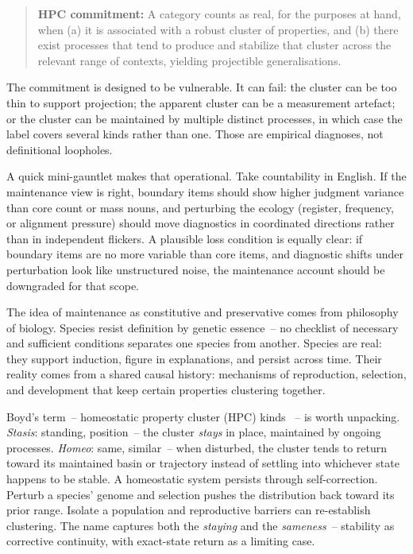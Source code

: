 \begin{quote}
\textbf{HPC commitment:} A category counts as real, for the purposes at hand, when (a) it is associated with a robust cluster of properties, and (b) there exist processes that tend to produce and stabilize that cluster across the relevant range of contexts, yielding projectible generalisations.
\end{quote}

The commitment is designed to be vulnerable. It can fail: the cluster can be too thin to support projection; the apparent cluster can be a measurement artefact; or the cluster can be maintained by multiple distinct processes, in which case the label covers several kinds rather than one. Those are empirical diagnoses, not definitional loopholes.

A quick mini-gauntlet makes that operational. Take countability in English. If the maintenance view is right, boundary items should show higher judgment variance than core count or mass nouns, and perturbing the ecology (register, frequency, or alignment pressure) should move diagnostics in coordinated directions rather than in independent flickers. A plausible loss condition is equally clear: if boundary items are no more variable than core items, and diagnostic shifts under perturbation look like unstructured noise, the maintenance account should be downgraded for that scope.

The idea of maintenance as constitutive and preservative comes from philosophy of biology. Species resist definition by genetic essence~-- no checklist of necessary and sufficient conditions separates one species from another. Species are real: they support induction, figure in explanations, and persist across time. Their reality comes from a shared causal history: mechanisms of reproduction, selection, and development that keep certain properties clustering together.

Boyd's term~-- homeostatic property cluster (HPC) kinds \citep{boyd1991,boyd1999}~-- is worth unpacking. \emph{Stasis}: standing, position~-- the cluster \emph{stays} in place, maintained by ongoing processes. \emph{Homeo}: same, similar~-- when disturbed, the cluster tends to return toward its maintained basin or trajectory instead of settling into whichever state happens to be stable. A homeostatic system persists through self-correction. Perturb a species' genome and selection pushes the distribution back toward its prior range. Isolate a population and reproductive barriers can re-establish clustering. The name captures both the \emph{staying} and the \emph{sameness}~-- stability as corrective continuity, with exact-state return as a limiting case.

